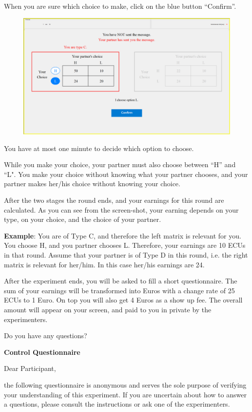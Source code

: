 \documentclass[12pt]{article}
\theoremstyle{break}
\begin{document}
When you are sure which choice to make, click on the blue button ``Confirm''.

\begin{figure}[h]
  \centering
    \includegraphics[width=.9\textwidth]{fig3-CT-instructions.png}
  \label{fig:fig3-CT-instructions}
\end{figure}

 
You have at most one minute to decide which option to choose.

While you make your choice, your partner must also choose between ``H'' and ``L". You make your choice without knowing what your partner chooses, and your partner makes her/his choice without knowing your choice. 

After the two stages the round ends, and your earnings for this round are calculated. As you can see from the screen-shot, your earning depends on your type, on your choice, and the choice of your partner. 

\textbf{Example}: You are of Type C, and therefore the left matrix is relevant for you. You choose H, and you partner chooses L. Therefore, your earnings are 10 ECUs in that round. Assume that your partner is of Type D in this round, i.e. the right matrix is relevant for her/him. In this case her/his earnings are 24. 

After the experiment ends, you will be asked to fill a short questionnaire. The sum of your earnings will be transformed into Euros with a change rate of 25 ECUs to 1 Euro. On top you will also get 4 Euros as a show up fee. The overall amount will appear on your screen, and paid to you in private by the experimenters. 

Do you have any questions? 

\textbf{Control Questionnaire}

Dear Participant,

the following questionnaire is anonymous and serves the sole purpose of verifying your understanding of this experiment. If you are uncertain about how to answer a questions, please consult the instructions or ask one of the experimenters.
\end{document}
